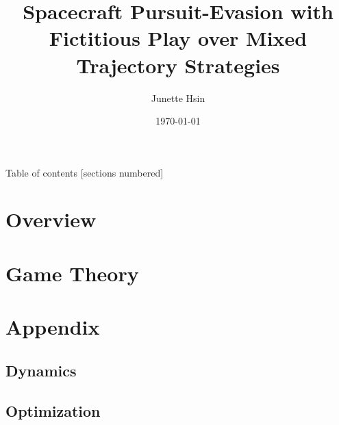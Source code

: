 \documentclass[10pt]{beamer}
\title{Spacecraft Pursuit-Evasion with Fictitious Play over Mixed Trajectory Strategies }
\date{\today}
\author{Junette Hsin }
\begin{document}
\maketitle


\begin{frame}{Table of contents}
  [sections numbered]
  \tableofcontents %
\end{frame}


\section{Overview} 



\section{Game Theory} 
 
 


\section{Appendix} 

\subsection{Dynamics}
 

\subsection{Optimization} 
 
%  

\end{document}
